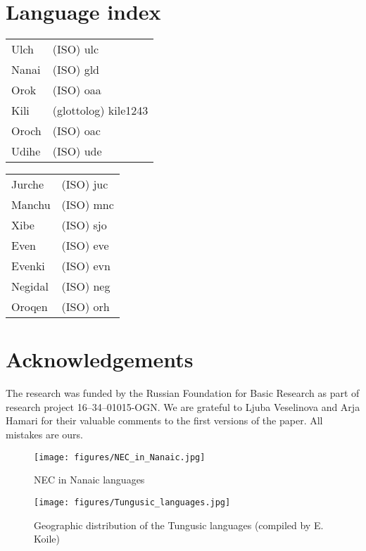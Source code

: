 \documentclass[output=paper,colorlinks,citecolor=brown]{langscibook}
\begin{document}
\section*{Language index}

\begin{tabularx}{.45\textwidth}{lQ}
    Ulch & (ISO) ulc\\
    Nanai & (ISO) gld\\
    Orok & (ISO) oaa\\
    Kili & (glottolog) kile1243\\
    Oroch & (ISO) oac\\
    Udihe & (ISO) ude\\
    \end{tabularx}
\begin{tabularx}{.45\textwidth}{lQ}
    Jurche & (ISO) juc\\
    Manchu & (ISO) mnc\\
    Xibe & (ISO) sjo\\
    Even & (ISO) eve\\
    Evenki & (ISO) evn\\
    Negidal & (ISO) neg\\
    Oroqen & (ISO) orh\\
\end{tabularx}


\section*{Acknowledgements}
The research was funded by the Russian Foundation for Basic Research as part of research project 16--34--01015-OGN. We are grateful to Ljuba Veselinova and Arja Hamari for their valuable comments to the first versions of the paper. All mistakes are ours.

\begin{figure}
    \captionsetup{name=Map}
    \texttt{[image: figures/NEC\_in\_Nanaic.jpg]}
    \caption{\label{fig:T1}NEC in Nanaic languages}

\end{figure}

\begin{sidewaysfigure}
    \captionsetup{name=Map}
    \texttt{[image: figures/Tungusic\_languages.jpg]}
    \caption{Geographic distribution of the Tungusic languages (compiled by E. Koile)}
    \label{fig:T2}
\end{sidewaysfigure}
\end{document}
